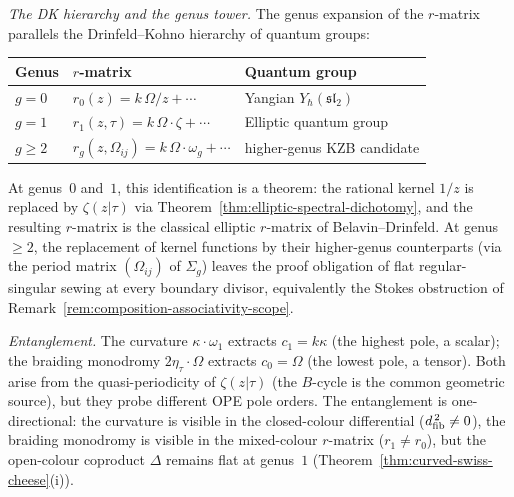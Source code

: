 \begin{computation}
\smallskip
\noindent
\emph{The DK hierarchy and the genus tower.}
The genus expansion of the $r$-matrix parallels
the Drinfeld--Kohno hierarchy of quantum groups:
\begin{center}
\small
\renewcommand{\arraystretch}{1.3}
\begin{tabular}{lll}
\toprule
\textbf{Genus} & \textbf{$r$-matrix} &
 \textbf{Quantum group} \\
\midrule
$g = 0$ & $r_0(z) = k\,\Omega/z + \cdots$
 & Yangian $Y_\hbar(\mathfrak{sl}_2)$ \\
$g = 1$ & $r_1(z,\tau) = k\,\Omega\cdot\zeta + \cdots$
 & Elliptic quantum group \\
$g \ge 2$ & $r_g(z,\Omega_{ij}) = k\,\Omega\cdot\omega_g + \cdots$
 & higher-genus KZB candidate \\
\bottomrule
\end{tabular}
\end{center}
At genus~$0$ and~$1$, this identification is a theorem:
the rational kernel $1/z$ is replaced by
$\zeta(z|\tau)$ via
Theorem~\ref{thm:elliptic-spectral-dichotomy},
and the resulting $r$-matrix is the classical
elliptic $r$-matrix of Belavin--Drinfeld.
At genus~$\ge 2$, the replacement of kernel functions
by their higher-genus counterparts (via the
period matrix $(\Omega_{ij})$ of $\Sigma_g$) leaves the
proof obligation of flat regular-singular sewing at every
boundary divisor, equivalently the Stokes obstruction of
Remark~\ref{rem:composition-associativity-scope}.

\smallskip
\noindent
\emph{Entanglement.}
The curvature $\kappa \cdot \omega_1$ extracts $c_1 = k\kappa$
(the highest pole, a scalar); the braiding monodromy
$2\eta_\tau \cdot \Omega$ extracts $c_0 = \Omega$
(the lowest pole, a tensor). Both arise from the
quasi-periodicity of $\zeta(z|\tau)$ (the $B$-cycle is
the common geometric source), but they probe different
OPE pole orders. The entanglement is one-directional:
the curvature is visible in the closed-colour
differential ($d_{\mathrm{fib}}^{\,2} \ne 0$), the braiding monodromy is
visible in the mixed-colour $r$-matrix ($r_1 \ne r_0$),
but the open-colour coproduct $\Delta$ remains
flat at genus~$1$
(Theorem~\ref{thm:curved-swiss-cheese}(i)).
\end{computation}

